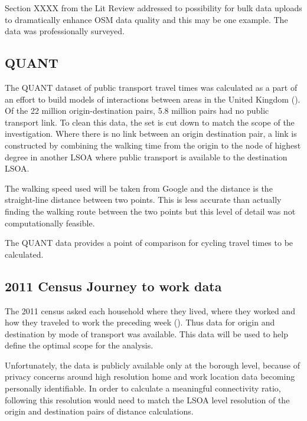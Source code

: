 Section XXXX from the Lit Review addressed to possibility for bulk data uploads to dramatically enhance OSM data quality and this may be one example. The data was professionally surveyed. 

\subsection{QUANT}

The QUANT dataset of public transport travel times was calculated as a part of an effort to build models of interactions between areas in the United Kingdom (\cite{quant}). Of the 22 million origin-destination pairs, 5.8 million pairs had no public transport link. To clean this data, the set is cut down to match the scope of the investigation. Where there is no link between an origin destination pair, a link is constructed by combining the walking time from the origin to the node of highest degree in another LSOA where public transport is available to the destination LSOA. 

The walking speed used will be taken from Google and the distance is the straight-line distance between two points. This is less accurate than actually finding the walking route between the two points but this level of detail was not computationally feasible. 

The QUANT data provides a point of comparison for cycling travel times to be calculated. 

\subsection{2011 Census Journey to work data}

The 2011 census asked each household where they lived, where they worked and how they traveled to work the preceding week (\cite{jtw}). Thus data for origin and destination by mode of transport was available. This data will be used to help define the optimal scope for the analysis. 

Unfortunately, the data is publicly available only at the borough level, because of privacy concerns around high resolution home and work location data becoming personally identifiable. In order to calculate a meaningful connectivity ratio, following \cite{furth2016network} this resolution would need to match the LSOA level resolution of the origin and destination pairs of distance calculations.  


